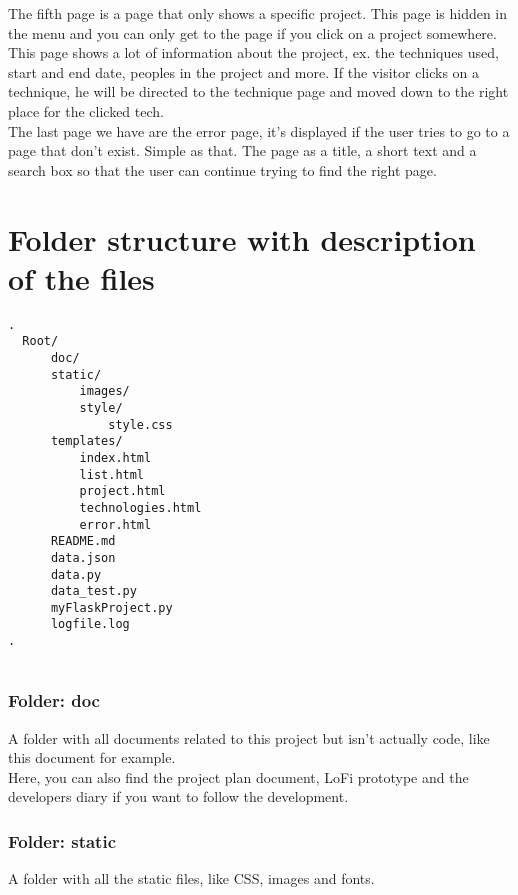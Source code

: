 \documentclass{TDP003mall}
\begin{document}
The fifth page is a page that only shows a specific project. This page is hidden in the menu and you can only get to the page if you click on a project somewhere. This page shows a lot of information about the project, ex. the techniques used, start and end date, peoples in the project and more. If the visitor clicks on a technique, he will be directed to the technique page and moved down to the right place for the clicked tech.\\

The last page we have are the error page, it's displayed if the user tries to go to a page that don't exist. Simple as that. The page as a title, a short text and a search box so that the user can continue trying to find the right page.\\



\newpage
\section{Folder structure with description of the files}

\begin{lstlisting}[backgroundcolor=\color{lightgray}]
.
  Root/
      doc/
      static/
          images/
          style/
              style.css
      templates/
          index.html
          list.html
          project.html
          technologies.html
          error.html
      README.md
      data.json
      data.py
      data_test.py
      myFlaskProject.py
      logfile.log
.
      
\end{lstlisting}

\subsubsection{Folder: doc}
A folder with all documents related to this project but isn't actually code, like this document for example.\\

Here, you can also find the project plan document, LoFi prototype and the developers diary if you want to follow the development.

\subsubsection{Folder: static}
A folder with all the static files, like CSS, images and fonts.\\
\end{document}
